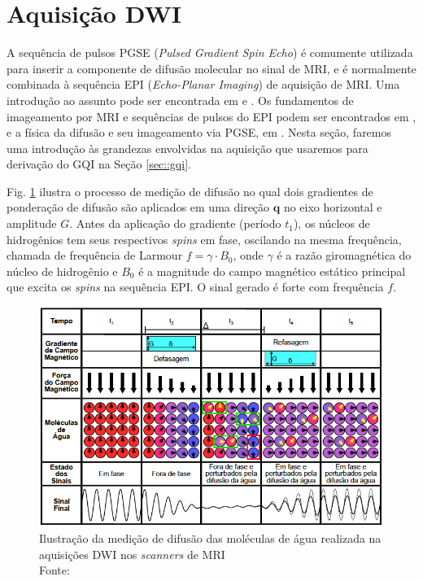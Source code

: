 \documentclass[
    12pt,                %
    oneside,            %
    a4paper,            %
    english,            %
    french,                %
    spanish,            %
    brazil                %
    ]{abntex2}
\begin{document}
\section{Aquisição DWI}
\label{sec::aquisicao_dwi}
A sequência de pulsos PGSE (\textit{Pulsed Gradient Spin Echo}) é comumente utilizada para inserir a componente de difusão molecular no sinal de MRI, e é normalmente combinada à sequência  EPI (\textit{Echo-Planar Imaging}) de aquisição de MRI. Uma introdução ao assunto pode ser encontrada em  e . Os fundamentos de imageamento por MRI e sequências de pulsos do EPI podem ser encontrados em , e a física da difusão e seu imageamento via PGSE, em . Nesta seção, faremos uma introdução às grandezas envolvidas na aquisição que usaremos para derivação do GQI na Seção \ref{sec::gqi}.

Fig. \ref{fig::pgse_ilustrado} ilustra o processo de medição de difusão no qual dois gradientes de ponderação de difusão são aplicados em uma direção $\mathbf{\hat{q}}$ no eixo horizontal e amplitude $G$. Antes da aplicação do gradiente (período $t_1$), os núcleos de hidrogênios tem seus respectivos \textit{spins} em fase, oscilando na mesma frequência, chamada de frequência de Larmour $f = \gamma \cdot B_0$, onde $\gamma$ é a razão giromagnética do núcleo de hidrogênio e $B_0$ é a magnitude do campo magnético estático principal que excita os \textit{spins} na sequência EPI. O sinal gerado é forte com frequência $f$.

\begin{figure}[ht]

    \centering
    \includegraphics[width=.8\linewidth, angle=0]{figs/HARDI/pgse2.png}
    \caption{Ilustração da medição de difusão das moléculas de água realizada na aquisições DWI nos \textit{scanners} de MRI \\
    Fonte: \cite{voltoline2016}
    }
    \label{fig::pgse_ilustrado}
   \hspace{1pt}
\end{figure}
\end{document}
